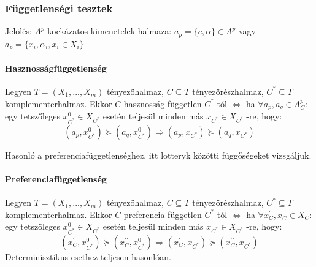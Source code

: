 \documentclass[a4paper,12pt]{article}
\begin{document}
\subsubsection{Függetlenségi tesztek}

Jelölés: $A^p$ kockázatos kimenetelek halmaza:  $a_p=\{c, \alpha\} \in A^p  $ vagy $a_{p} = \{x_i, \alpha_i, x_i \in X_i\}$




\paragraph{Hasznosságfüggetlenség}

Legyen $T=(X_1,...,X_m)$ tényezőhalmaz, $C \subseteq T$ tényezőrészhalmaz,  $C^* \subseteq T $ komplementerhalmaz. Ekkor $C$ hasznosság független $C^*$-tól $\Leftrightarrow$ ha $\forall a_{p}, a_q \in A^p_C:$  egy tetszőleges $x_{C^{*}}^0 \in X_{C^*}$  esetén teljesül minden más $ x_{C^{*}} \in X_{C^*}$ -re, hogy:
\begin{equation}
(a_p, x_{C^{*}}^0) \succeq (a_q, x_{C^{*}}^0) 
\Rightarrow
(a_p, x_{C^{*}}) \succeq (a_q, x_{C^{*}}) 
\end{equation}

Hasonló a preferenciafüggetlenséghez, itt lotteryk közötti függőségeket vizsgáljuk.

\paragraph{Preferenciafüggetlenség}

Legyen $T=(X_1,...,X_m)$ tényezőhalmaz, $C \subseteq T$ tényezőrészhalmaz,  $C^* \subseteq T $ komplementerhalmaz. Ekkor $C$ preferencia független $C^*$-tól $\Leftrightarrow$ ha $\forall x_C^{\prime}, x_C^{\prime\prime} \in X_C:$  egy tetszőleges $x_{C^{*}}^0 \in X_{C^*}$  esetén teljesül minden más $ x_{C^{*}} \in X_{C^*}$ -re, hogy:
\begin{equation}
(x_C^{\prime}, x_{C^{*}}^0) \succeq (x_C^{\prime\prime}, x_{C^{*}}^0) 
\Rightarrow
(x_C^{\prime}, x_{C^{*}}) \succeq (x_C^{\prime\prime}, x_{C^{*}}) 
\end{equation}
Determinisztikus esethez teljesen hasonlóan.
\end{document}
